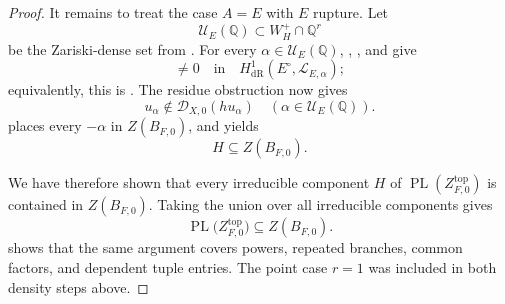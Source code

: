 \documentclass[10pt,a4paper]{amsart}
\DeclareMathOperator{\PL}{PL}
\newcommand{\D}{\mathscr D}
\newcommand{\Lcal}{\mathscr L}
\newcommand{\Q}{\mathbb Q}
\begin{document}
\begin{proof}
It remains to treat the case $A=E$ with $E$ rupture. Let
\begin{equation*}
\mathcal U_E(\Q)\subset W_H^+\cap\Q^r
\end{equation*}
be the Zariski-dense set from . For every $\alpha\in\mathcal U_E(\Q)$, , , and  give
\begin{equation*}
[R_{E,\alpha}]\neq0
 \quad\text{in}\quad
 H^1_{\mathrm{dR}}(E^\circ,\Lcal_{E,\alpha});
\end{equation*}
equivalently, this is . The residue obstruction  now gives
\begin{equation*}
u_\alpha\notin\D_{X,0}(hu_\alpha)
 \quad(\alpha\in\mathcal U_E(\Q)).
\end{equation*}
 places every $-\alpha$ in $Z(B_{F,0})$, and  yields
\begin{equation*}
H\subseteq Z(B_{F,0}).
\end{equation*}

We have therefore shown that every irreducible component $H$ of $\PL(Z^{\mathrm{top}}_{F,0})$ is contained in $Z(B_{F,0})$. Taking the union over all irreducible components gives
\begin{equation*}
\PL\bigl(Z^{\mathrm{top}}_{F,0}\bigr)
  \subseteq Z(B_{F,0}).
\end{equation*}
 shows that the same argument covers powers, repeated branches, common factors, and dependent tuple entries. The point case $r=1$ was included in both density steps above.
\end{proof}
\end{document}
